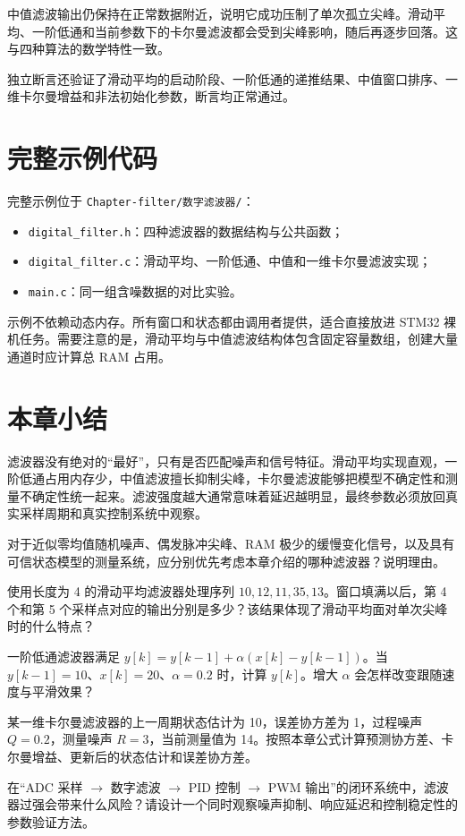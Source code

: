中值滤波输出仍保持在正常数据附近，说明它成功压制了单次孤立尖峰。滑动平均、一阶低通和当前参数下的卡尔曼滤波都会受到尖峰影响，随后再逐步回落。这与四种算法的数学特性一致。

独立断言还验证了滑动平均的启动阶段、一阶低通的递推结果、中值窗口排序、一维卡尔曼增益和非法初始化参数，断言均正常通过。

\section{完整示例代码}

完整示例位于 \texttt{Chapter-filter/数字滤波器/}：

\begin{itemize}
\item \texttt{digital\_filter.h}：四种滤波器的数据结构与公共函数；
\item \texttt{digital\_filter.c}：滑动平均、一阶低通、中值和一维卡尔曼滤波实现；
\item \texttt{main.c}：同一组含噪数据的对比实验。
\end{itemize}

示例不依赖动态内存。所有窗口和状态都由调用者提供，适合直接放进 STM32 裸机任务。需要注意的是，滑动平均与中值滤波结构体包含固定容量数组，创建大量通道时应计算总 RAM 占用。

\section{本章小结}

滤波器没有绝对的“最好”，只有是否匹配噪声和信号特征。滑动平均实现直观，一阶低通占用内存少，中值滤波擅长抑制尖峰，卡尔曼滤波能够把模型不确定性和测量不确定性统一起来。滤波强度越大通常意味着延迟越明显，最终参数必须放回真实采样周期和真实控制系统中观察。

\begin{problemset}
\item 对于近似零均值随机噪声、偶发脉冲尖峰、RAM 极少的缓慢变化信号，以及具有可信状态模型的测量系统，应分别优先考虑本章介绍的哪种滤波器？说明理由。
\item 使用长度为 4 的滑动平均滤波器处理序列 $10,12,11,35,13$。窗口填满以后，第 4 个和第 5 个采样点对应的输出分别是多少？该结果体现了滑动平均面对单次尖峰时的什么特点？
\item 一阶低通滤波器满足 $y[k]=y[k-1]+\alpha(x[k]-y[k-1])$。当 $y[k-1]=10$、$x[k]=20$、$\alpha=0.2$ 时，计算 $y[k]$。增大 $\alpha$ 会怎样改变跟随速度与平滑效果？
\item 某一维卡尔曼滤波器的上一周期状态估计为 10，误差协方差为 1，过程噪声 $Q=0.2$，测量噪声 $R=3$，当前测量值为 14。按照本章公式计算预测协方差、卡尔曼增益、更新后的状态估计和误差协方差。
\item 在“ADC 采样 $\rightarrow$ 数字滤波 $\rightarrow$ PID 控制 $\rightarrow$ PWM 输出”的闭环系统中，滤波器过强会带来什么风险？请设计一个同时观察噪声抑制、响应延迟和控制稳定性的参数验证方法。
\end{problemset}
